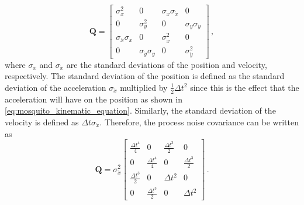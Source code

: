 \begin{equation}
  \label{eq:kalman_filter_process_noise_covariance_matrix}
  \mathbf{Q} = \begin{bmatrix}
    \sigma_{x}^2               & 0                          & \sigma_{x}\sigma_{\dot{x}} & 0                          \\
    0                          & \sigma_{y}^2               & 0                          & \sigma_{y}\sigma_{\dot{y}} \\
    \sigma_{\dot{x}}\sigma_{x} & 0                          & \sigma_{\dot{x}}^2         & 0                          \\
    0                          & \sigma_{\dot{y}}\sigma_{y} & 0                          & \sigma_{\dot{y}}^2
  \end{bmatrix}\,,
\end{equation}
where $\sigma_{x}$ and $\sigma_{\dot{x}}$ are the standard deviations of the position and velocity, respectively. The standard deviation of the position is defined as the standard deviation of the acceleration $\sigma_{\ddot{x}}$ multiplied by $\frac{1}{2}\Delta t^2$ since this is the effect that the acceleration will have on the position as shown in \autoref{eq:mosquito_kinematic_equation}. Similarly, the standard deviation of the velocity is defined as $\Delta t \sigma_{\ddot{x}}$. Therefore, the process noise covariance can be written as
\begin{equation}
  \mathbf{Q} =
  \sigma_{\ddot{x}}^{2}
  \begin{bmatrix}
    \frac{\Delta t^4}{4} & 0                    & \frac{\Delta t^3}{2} & 0                    \\
    0                    & \frac{\Delta t^4}{4} & 0                    & \frac{\Delta t^3}{2} \\
    \frac{\Delta t^3}{2} & 0                    & \Delta t^2           & 0                    \\
    0                    & \frac{\Delta t^3}{2} & 0                    & \Delta t^2
  \end{bmatrix}\,.
\end{equation}

